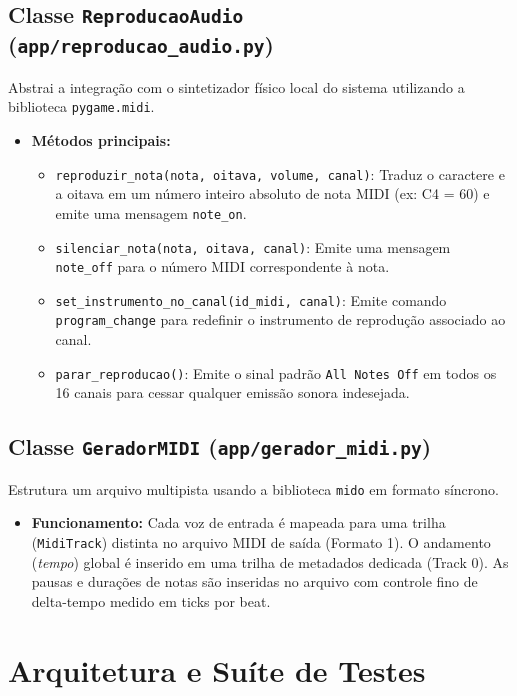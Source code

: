 \documentclass[12pt, a4paper]{article}
\begin{document}
\subsection{Classe \texttt{ReproducaoAudio} (\texttt{app/reproducao\_audio.py})}
Abstrai a integração com o sintetizador físico local do sistema utilizando a biblioteca \texttt{pygame.midi}.
\begin{itemize}
  \item \textbf{Métodos principais:}
    \begin{itemize}
      \item \texttt{reproduzir\_nota(nota, oitava, volume, canal)}: Traduz o caractere e a oitava em um número inteiro absoluto de nota MIDI (ex: C4 = 60) e emite uma mensagem \texttt{note\_on}.
      \item \texttt{silenciar\_nota(nota, oitava, canal)}: Emite uma mensagem \texttt{note\_off} para o número MIDI correspondente à nota.
      \item \texttt{set\_instrumento\_no\_canal(id\_midi, canal)}: Emite comando \texttt{program\_change} para redefinir o instrumento de reprodução associado ao canal.
      \item \texttt{parar\_reproducao()}: Emite o sinal padrão \texttt{All Notes Off} em todos os 16 canais para cessar qualquer emissão sonora indesejada.
    \end{itemize}
\end{itemize}

\subsection{Classe \texttt{GeradorMIDI} (\texttt{app/gerador\_midi.py})}
Estrutura um arquivo multipista usando a biblioteca \texttt{mido} em formato síncrono.
\begin{itemize}
  \item \textbf{Funcionamento:} Cada voz de entrada é mapeada para uma trilha (\texttt{MidiTrack}) distinta no arquivo MIDI de saída (Formato 1). O andamento (\textit{tempo}) global é inserido em uma trilha de metadados dedicada (Track 0). As pausas e durações de notas são inseridas no arquivo com controle fino de delta-tempo medido em ticks por beat.
\end{itemize}

\section{Arquitetura e Suíte de Testes}
\end{document}
